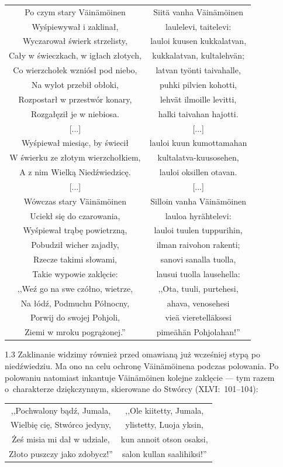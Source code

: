 \documentclass[11pt,a4paper,twoside]{report}
\begin{document}
{\centering
\small
\begin{longtable}{c c}
Po czym stary Väinämöinen		    &  Siitä vanha Väinämöinen\\
Wyśpiewywał i zaklinał, 			&  laulelevi, taitelevi:\\
Wyczarował świerk strzelisty, 		&  lauloi kuusen kukkalatvan,\\
Cały w świeczkach, w igłach złotych,&  kukkalatvan, kultalehvän;\\
Co wierzchołek wzniósł pod niebo, 	&  latvan työnti taivahalle,\\
Na wylot przebił obłoki, 			&  puhki pilvien kohotti,\\
Rozpostarł w przestwór konary, 		&  lehvät ilmoille levitti,\\
Rozgałęził je w niebiosa. 		    &  halki taivahan hajotti.\\
{[...]}				             	&  {[...]}\\
Wyśpiewał miesiąc, by świecił		&  lauloi kuun kumottamahan\\
W świerku ze złotym wierzchołkiem, 	&  kultalatva-kuusosehen,\\
A z nim Wielką Niedźwiedzicę. 		&  lauloi oksillen otavan.\\
{[...]}					        &  {[...]}\\
Wówczas stary Väinämöinen		&  Silloin vanha Väinämöinen\\
Uciekł się do czarowania, 		&  lauloa hyrähtelevi:\\
Wyśpiewał trąbę powietrzną, 	&  lauloi tuulen tuppurihin,\\
Pobudził wicher zajadły, 		&  ilman raivohon rakenti;\\
Rzecze takimi słowami, 			&  sanovi sanalla tuolla,\\
Takie wypowie zaklęcie: 		&  lausui tuolla lausehella:\\
,,Weź go na swe czółno, wietrze,&  ,,Ota, tuuli, purtehesi,\\
Na łódź, Podmuchu Północny, 	&  ahava, venosehesi\\
Porwij do swojej Pohjoli, 		&  vieä vieretelläksesi\\
Ziemi w mroku pogrążonej.'' 	&  pimeähän Pohjolahan!''\\
\end{longtable}
}
\begin{spacing}{1.3}
Zaklinanie widzimy również przed omawianą już wcześniej stypą po niedźwiedziu. Ma ono na celu ochronę Väinämöinena podczas polowania. Po polowaniu natomiast inkantuje Väinämöinen kolejne zaklęcie --- tym razem o~charakterze dziękczynnym, skierowane do Stwórcy (XLVI:~101--104):
\end{spacing}
{\centering
\small
\begin{longtable}{c c}
,,Pochwalony bądź, Jumala,	    & ,,Ole kiitetty, Jumala,\\
Wielbię cię, Stwórco jedyny, 	& ylistetty, Luoja yksin,\\
Żeś misia mi dał w udziale,	    & kun annoit otson osaksi,\\
Złoto puszczy jako zdobycz!'' 	& salon kullan saalihiksi!''\\
\end{longtable}
}
\end{document}

